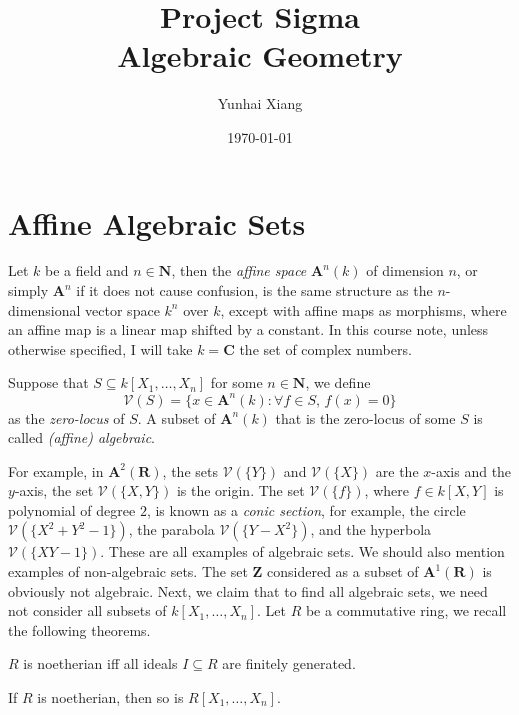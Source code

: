 \documentclass[11pt]{book}
\title{
\vspace{-2.0cm}
\Large{Project Sigma}\\
\vspace{1cm}
\huge{\bf{Algebraic Geometry}}
\vspace{3cm}}
\author{Yunhai Xiang}
\date{\today}
\begin{document}
\maketitle
\doublespacing
\tableofcontents
\singlespacing
\newpage
\chapter{Affine Algebraic Sets}
Let $k$ be a field and $n\in\mathbf N$, then the \textit{affine space} $\mathbf A^n(k)$ of dimension $n$, or simply $\mathbf A^n$ if it does not cause confusion, is the same structure as the $n$-dimensional vector space $k^n$ over $k$, except with affine maps as morphisms, where an affine map is a linear map shifted by a constant. In this course note, unless otherwise specified, I will take $k=\mathbf C$ the set of complex numbers.

\begin{definition}
Suppose that $S\subseteq k[X_1,\dots,X_n]$ for some $n\in\mathbf N$, we define
\[\mathcal{V}(S)=\{x\in \mathbf A^n(k):\forall f\in S,\,f(x)=0\}\]
as the \textit{zero-locus} of $S$. A subset of $\mathbf A^n(k)$ that is the zero-locus of some $S$ is called \textit{(affine) algebraic}.
\end{definition}
For example, in $\mathbf{A}^2(\mathbf R)$, the sets $\mathcal{V}(\{Y\})$ and $\mathcal{V}(\{X\})$ are the $x$-axis and the $y$-axis, the set $\mathcal{V}(\{X,Y\})$ is the origin. The set $\mathcal{V}(\{f\})$, where $f\in k[X,Y]$ is polynomial of degree $2$, is known as a \textit{conic section}, for example, the circle $\mathcal{V}(\{X^2+Y^2-1\})$, the parabola $\mathcal{V}(\{Y-X^2\})$, and the hyperbola $\mathcal{V}(\{XY-1\})$. These are all examples of algebraic sets. We should also mention examples of non-algebraic sets. The set $\mathbf Z$ considered as a subset of $\mathbf A^1(\mathbf R)$ is obviously not algebraic. Next, we claim that to find all algebraic sets, we need not consider all subsets of $k[X_1,\dots,X_n]$. Let $R$ be a commutative ring, we recall the following theorems.
\begin{theorem}$R$ is noetherian iff all ideals $I\subseteq R$ are finitely generated.
\end{theorem}
\begin{theorem}If $R$ is noetherian, then so is $R[X_1,\dots,X_n]$.
\end{theorem}
\end{document}
